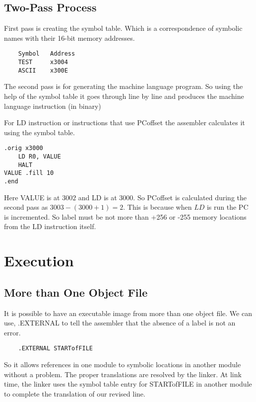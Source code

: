 \subsection{Two-Pass Process}
First pass is creating the symbol table. Which is a correspondence of symbolic names with their 16-bit memory addresses. 
\begin{verbatim}
    Symbol   Address
    TEST     x3004
    ASCII    x300E
\end{verbatim}


The second pass is for generating the machine language program. So using the help of the symbol table it goes through line by line and produces the machine language instruction (in binary)

For LD instruction or instructions that use PCoffset the assembler calculates it using the symbol table. 
\begin{verbatim}
.orig x3000
    LD R0, VALUE
    HALT
VALUE .fill 10
.end
\end{verbatim}
Here VALUE is at $3002$ and LD is at 3000. So PCoffset is calculated during the second pass as  $3003 - (3000 + 1) = 2$. This is because  when $LD$ is run the PC is incremented. So label must be not more than +256 or -255 memory locations from the LD instruction itself.



\section{Execution}
\subsection{More than One Object File}
It is possible to have an executable image from more than one object file. We can use, .EXTERNAL to tell the assembler that the absence of a label is not an error. 

\begin{verbatim}
    .EXTERNAL STARTofFILE
\end{verbatim}

So it allows references in one module to symbolic locations in another module without a problem. The proper translations are resolved by the linker. At link time, the linker uses the symbol table entry for STARTofFILE in another module to complete the translation of our revised line.




